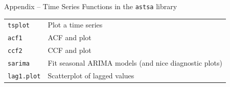 \documentclass[ignorenonframetext,xcolor=x11names]{beamer}
\begin{document}
\begin{frame}{Appendix -- Time Series Functions in the \texttt{astsa} library}
\footnotesize
\renewcommand{\arraystretch}{1.5}
\begin{tabularx}{\textwidth}{l|X} \hline
\texttt{tsplot} & Plot a time series \\
\texttt{acf1} & ACF and plot \\
\texttt{ccf2} & CCF and plot \\
\texttt{sarima} & Fit seasonal ARIMA models (and nice diagnostic plots) \\
\texttt{lag1.plot} & Scatterplot of lagged values \\ \hline
\end{tabularx}
\end{frame}
\end{document}
